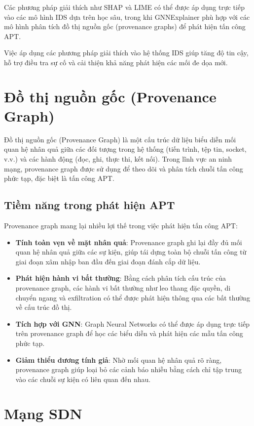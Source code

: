 Các phương pháp giải thích như SHAP và LIME có thể được áp dụng trực tiếp vào các mô hình IDS dựa trên học sâu, trong khi GNNExplainer phù hợp với các mô hình phân tích đồ thị nguồn gốc (provenance graphs) để phát hiện tấn công APT.

Việc áp dụng các phương pháp giải thích vào hệ thống IDS giúp tăng độ tin cậy, hỗ trợ điều tra sự cố và cải thiện khả năng phát hiện các mối đe dọa mới.

\section{Đồ thị nguồn gốc (Provenance Graph)}
\label{sec:provenance}

Đồ thị nguồn gốc (Provenance Graph) là một cấu trúc dữ liệu biểu diễn mối quan hệ nhân quả giữa các đối tượng trong hệ thống (tiến trình, tệp tin, socket, v.v.) và các hành động (đọc, ghi, thực thi, kết nối). Trong lĩnh vực an ninh mạng, provenance graph được sử dụng để theo dõi và phân tích chuỗi tấn công phức tạp, đặc biệt là tấn công APT.

\subsection{Tiềm năng trong phát hiện APT}
Provenance graph mang lại nhiều lợi thế trong việc phát hiện tấn công APT:
\begin{itemize}
    \item \textbf{Tính toàn vẹn về mặt nhân quả}: Provenance graph ghi lại đầy đủ mối quan hệ nhân quả giữa các sự kiện, giúp tái dựng toàn bộ chuỗi tấn công từ giai đoạn xâm nhập ban đầu đến giai đoạn đánh cắp dữ liệu.
    \item \textbf{Phát hiện hành vi bất thường}: Bằng cách phân tích cấu trúc của provenance graph, các hành vi bất thường như leo thang đặc quyền, di chuyển ngang và exfiltration có thể được phát hiện thông qua các bất thường về cấu trúc đồ thị.
    \item \textbf{Tích hợp với GNN}: Graph Neural Networks có thể được áp dụng trực tiếp trên provenance graph để học các biểu diễn và phát hiện các mẫu tấn công phức tạp.
    \item \textbf{Giảm thiểu dương tính giả}: Nhờ mối quan hệ nhân quả rõ ràng, provenance graph giúp loại bỏ các cảnh báo nhiễu bằng cách chỉ tập trung vào các chuỗi sự kiện có liên quan đến nhau.
\end{itemize}

\section{Mạng SDN}
\label{sec:sdn}

